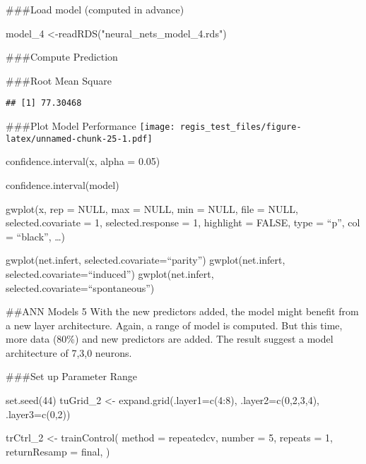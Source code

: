 \documentclass[
]{article}
\newenvironment{Shaded}{\begin{snugshade}}{\end{snugshade}}
\newcommand{\AttributeTok}[1]{\textcolor[rgb]{0.77,0.63,0.00}{#1}}
\newcommand{\DecValTok}[1]{\textcolor[rgb]{0.00,0.00,0.81}{#1}}
\newcommand{\FunctionTok}[1]{\textcolor[rgb]{0.00,0.00,0.00}{#1}}
\newcommand{\NormalTok}[1]{#1}
\newcommand{\OtherTok}[1]{\textcolor[rgb]{0.56,0.35,0.01}{#1}}
\newcommand{\SpecialCharTok}[1]{\textcolor[rgb]{0.00,0.00,0.00}{#1}}
\newcommand{\StringTok}[1]{\textcolor[rgb]{0.31,0.60,0.02}{#1}}
\begin{document}
\#\#\#Load model (computed in advance)

\begin{Shaded}
\begin{Highlighting}[]
\NormalTok{model\_4 }\OtherTok{\textless{}{-}}\FunctionTok{readRDS}\NormalTok{(}\StringTok{"neural\_nets\_model\_4.rds"}\NormalTok{)}
\end{Highlighting}
\end{Shaded}

\#\#\#Compute Prediction

\#\#\#Root Mean Square

\begin{verbatim}
## [1] 77.30468
\end{verbatim}

\#\#\#Plot Model Performance
\texttt{[image: regis\_test\_files/figure-latex/unnamed-chunk-25-1.pdf]}

confidence.interval(x, alpha = 0.05)

confidence.interval(model)

gwplot(x, rep = NULL, max = NULL, min = NULL, file = NULL,
selected.covariate = 1, selected.response = 1, highlight = FALSE, type =
``p'', col = ``black'', \ldots)

gwplot(net.infert, selected.covariate=``parity'') gwplot(net.infert,
selected.covariate=``induced'') gwplot(net.infert,
selected.covariate=``spontaneous'')

\#\#ANN Models 5 With the new predictors added, the model might benefit
from a new layer architecture. Again, a range of model is computed. But
this time, more data (80\%) and new predictors are added. The result
suggest a model architecture of 7,3,0 neurons.

\#\#\#Set up Parameter Range

\begin{Shaded}
\begin{Highlighting}[]
\FunctionTok{set.seed}\NormalTok{(}\DecValTok{44}\NormalTok{)}
\NormalTok{tuGrid\_2 }\OtherTok{\textless{}{-}} \FunctionTok{expand.grid}\NormalTok{(}\AttributeTok{.layer1=}\FunctionTok{c}\NormalTok{(}\DecValTok{4}\SpecialCharTok{:}\DecValTok{8}\NormalTok{), }\AttributeTok{.layer2=}\FunctionTok{c}\NormalTok{(}\DecValTok{0}\NormalTok{,}\DecValTok{2}\NormalTok{,}\DecValTok{3}\NormalTok{,}\DecValTok{4}\NormalTok{), }\AttributeTok{.layer3=}\FunctionTok{c}\NormalTok{(}\DecValTok{0}\NormalTok{,}\DecValTok{2}\NormalTok{))}

\NormalTok{trCtrl\_2 }\OtherTok{\textless{}{-}} \FunctionTok{trainControl}\NormalTok{(}
  \AttributeTok{method =} \StringTok{\textquotesingle{}repeatedcv\textquotesingle{}}\NormalTok{,}
  \AttributeTok{number =} \DecValTok{5}\NormalTok{,}
  \AttributeTok{repeats =} \DecValTok{1}\NormalTok{,}
  \AttributeTok{returnResamp =} \StringTok{\textquotesingle{}final\textquotesingle{}}\NormalTok{,}
\NormalTok{)}
\end{Highlighting}
\end{Shaded}
\end{document}
